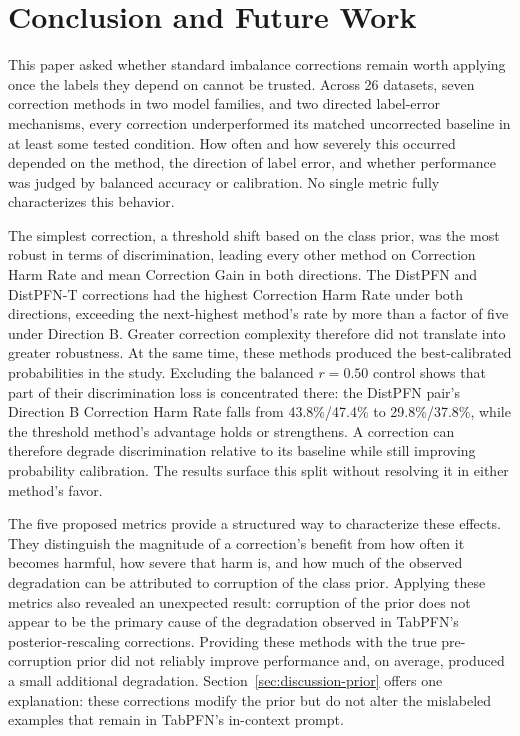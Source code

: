 \section{Conclusion and Future Work}
\label{sec:conclusion}

This paper asked whether standard imbalance corrections remain worth applying
once the labels they depend on cannot be trusted. Across 26 datasets, seven
correction methods in two model families, and two directed label-error
mechanisms, every correction underperformed its matched uncorrected baseline in
at least some tested condition. How often and how severely this occurred
depended on the method, the direction of label error, and whether performance
was judged by balanced accuracy or calibration. No single metric fully
characterizes this behavior.

The simplest correction, a threshold shift based on the class prior, was the
most robust in terms of discrimination, leading every other method on
Correction Harm Rate and mean Correction Gain in both directions. The DistPFN
and DistPFN-T corrections had the highest Correction Harm Rate under both
directions, exceeding the next-highest method's rate by more than a factor of
five under Direction B. Greater correction complexity therefore did not
translate into greater robustness. At the same time, these methods produced the
best-calibrated probabilities in the study. Excluding the balanced $r{=}0.50$
control shows that part of their discrimination loss is concentrated there: the
DistPFN pair's Direction B Correction Harm Rate falls from 43.8\%/47.4\% to
29.8\%/37.8\%, while the threshold method's advantage holds or strengthens. A
correction can therefore degrade discrimination relative to its baseline while
still improving probability calibration. The results surface this split without
resolving it in either method's favor.

The five proposed metrics provide a structured way to characterize these
effects. They distinguish the magnitude of a correction's benefit from how
often it becomes harmful, how severe that harm is, and how much of the observed
degradation can be attributed to corruption of the class prior. Applying these
metrics also revealed an unexpected result: corruption of the prior does not
appear to be the primary cause of the degradation observed in TabPFN's
posterior-rescaling corrections. Providing these methods with the true
pre-corruption prior did not reliably improve performance and, on average,
produced a small additional degradation. Section~\ref{sec:discussion-prior}
offers one explanation: these corrections modify the prior but do not alter the
mislabeled examples that remain in TabPFN's in-context prompt.


